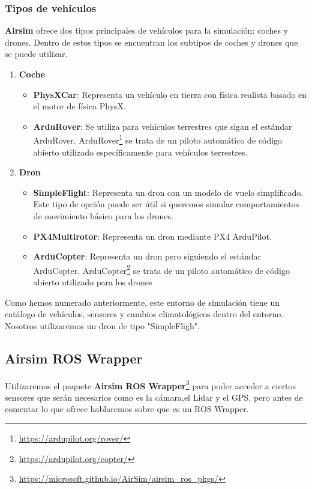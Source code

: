 \subsubsection{Tipos de vehículos}
\label{sec:airsim}
\textbf{Airsim} ofrece dos tipos principales de vehículos para la simulación: coches y drones. Dentro de estos tipos se encuentran los subtipos de coches y drones que se puede utilizar.
\begin{enumerate}
  \item \textbf{Coche}
    \begin{itemize}
      \item \textbf{PhysXCar}: Representa un vehículo en tierra con física realista basado en el motor de física PhysX.
      \item \textbf{ArduRover}: Se utiliza para vehículos terrestres que sigan el estándar ArduRover. ArduRover\footnote{\url{https://ardupilot.org/rover/}} 
      se trata de un piloto automático de código abierto utilizado específicamente para vehículos terrestres.
    \end{itemize}
  \item \textbf{Dron}
    \begin{itemize}
      \item \textbf{SimpleFlight}: Representa un dron con un modelo de vuelo simplificado. Este tipo de opción puede ser útil si queremos simular comportamientos 
      de movimiento básico para los drones.
      \item \textbf{PX4Multirotor}: Representa un dron mediante PX4 ArduPilot. 
      \item \textbf{ArduCopter}: Representa un dron pero siguiendo el estándar ArduCopter. ArduCopter\footnote{\url{https://ardupilot.org/copter/}} 
      se trata de un piloto automático de código abierto utilizado para los drones 
    \end{itemize}
  
\end{enumerate}

Como hemos numerado anteriormente, este entorno de simulación tiene un catálogo de vehículos, sensores y
cambios climatológicos dentro del entorno. Nosotros utilizaremos un dron de tipo "SimpleFligh". 

\subsection{Airsim ROS Wrapper}
\label{sec:wrapper}
Utilizaremos el paquete \textbf{Airsim ROS Wrapper}\footnote{\url{https://microsoft.github.io/AirSim/airsim_ros_pkgs/}} para poder acceder a ciertos sensores 
que serán necesarios como es la cámara,el Lidar y el GPS, pero antes de comentar lo que ofrece hablaremos sobre que es un ROS Wrapper. 

